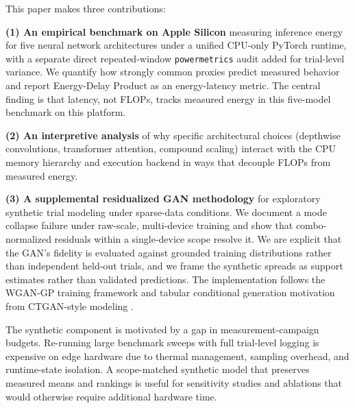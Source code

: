 \documentclass{svproc}
\begin{document}
This paper makes three contributions:

\textbf{(1) An empirical benchmark on Apple Silicon} measuring inference
energy for five neural network architectures under a unified CPU-only PyTorch
runtime, with a separate direct repeated-window \texttt{powermetrics} audit
added for trial-level variance. We quantify how strongly common proxies
predict measured behavior and report Energy-Delay Product as an
energy-latency metric. The central finding is that latency, not FLOPs, tracks
measured energy in this five-model benchmark on this platform.

\textbf{(2) An interpretive analysis} of why specific architectural choices
(depthwise convolutions, transformer attention, compound scaling) interact with
the CPU memory hierarchy and execution backend in ways that decouple FLOPs from
measured energy.

\textbf{(3) A supplemental residualized GAN methodology} for exploratory
synthetic trial modeling under sparse-data conditions. We document a mode
collapse failure under raw-scale, multi-device training and show that
combo-normalized residuals within a single-device scope resolve it. We are
explicit that the GAN's fidelity is evaluated against grounded training
distributions rather than independent held-out trials, and we frame the
synthetic spreads as support estimates rather than validated predictions. The
implementation follows the WGAN-GP training framework \cite{wgangp2017} and
tabular conditional generation motivation from CTGAN-style modeling
\cite{ctgan2019}.

The synthetic component is motivated by a gap in measurement-campaign
budgets. Re-running large benchmark sweeps with full trial-level logging is
expensive on edge hardware due to thermal management, sampling overhead, and
runtime-state isolation. A scope-matched synthetic model that preserves
measured means and rankings is useful for sensitivity studies and ablations
that would otherwise require additional hardware time.
\end{document}
